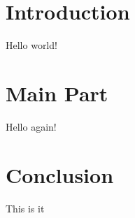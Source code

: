 \documentclass[12pt, a4paper]{article}
\begin{document}
\tableofcontents

\section{Introduction}

Hello world!

\section{Main Part}

Hello again!

\section{Conclusion}

This is it
\end{document}
